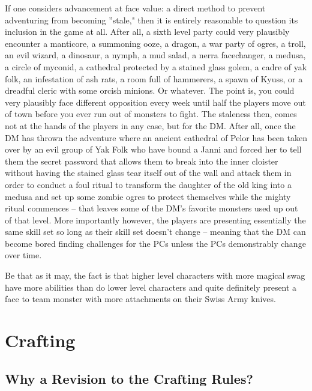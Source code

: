 If one considers advancement at face value: a direct method to prevent adventuring from becoming ''stale," then it is entirely reasonable to question its inclusion in the game at all. After all, a sixth level party could very plausibly encounter a manticore, a summoning ooze, a dragon, a war party of ogres, a troll, an evil wizard, a dinosaur, a nymph, a mud salad, a nerra facechanger, a medusa, a circle of myconid, a cathedral protected by a stained glass golem, a cadre of yak folk, an infestation of ash rats, a room full of hammerers, a spawn of Kyuss, or a dreadful cleric with some orcish minions. Or whatever. The point is, you could very plausibly face different opposition every week until half the players move out of town before you ever run out of monsters to fight. The staleness then, comes not at the hands of the players in any case, but for the DM. After all, once the DM has thrown the adventure where an ancient cathedral of Pelor has been taken over by an evil group of Yak Folk who have bound a Janni and forced her to tell them the secret password that allows them to break into the inner cloister without having the stained glass tear itself out of the wall and attack them in order to conduct a foul ritual to transform the daughter of the old king into a medusa and set up some zombie ogres to protect themselves while the mighty ritual commences -- that leaves some of the DM's favorite monsters used up out of that level. More importantly however, the players are presenting essentially the same skill set so long as their skill set doesn't change -- meaning that the DM can become bored finding challenges for the PCs unless the PCs demonstrably change over time.

Be that as it may, the fact is that higher level characters with more magical swag have more abilities than do lower level characters and quite definitely present a face to team monster with more attachments on their Swiss Army knives.


\section{Crafting}

\subsection{Why a Revision to the Crafting Rules?}

